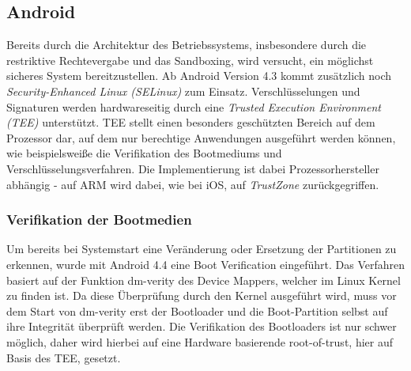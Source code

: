 \subsection{Android}\label{sec:android-hwsec}

	Bereits durch die Architektur des Betriebssystems, insbesondere durch die
	restriktive Rechtevergabe und das Sandboxing, wird versucht, ein möglichst
	sicheres System bereitzustellen. Ab Android Version 4.3 kommt zusätzlich noch
	\textit{Security-Enhanced Linux (SELinux)} zum Einsatz. Verschlüsselungen und
	Signaturen werden hardwareseitig durch eine \textit{Trusted Execution
	Environment (TEE)} unterstützt. TEE stellt einen besonders geschützten Bereich
	auf dem Prozessor dar, auf dem nur berechtige Anwendungen ausgeführt werden
	können, wie beispielsweiße die Verifikation des Bootmediums und
	Verschlüsselungsverfahren. Die Implementierung ist dabei Prozessorhersteller
	abhängig - auf ARM wird dabei, wie bei iOS, auf \textit{TrustZone}
	\cite{TEE_ARM} zurückgegriffen.
	
	\subsubsection{Verifikation der Bootmedien}
	\label{sec:VerifikationDerBootmedien} Um bereits bei Systemstart eine
	Veränderung oder Ersetzung der Partitionen zu erkennen, wurde mit Android 4.4
	eine Boot Verification eingeführt. Das Verfahren basiert auf der Funktion
	dm-verity des Device Mappers, welcher im Linux Kernel zu finden ist. Da diese
	Überprüfung durch den Kernel ausgeführt wird, muss vor dem Start von dm-verity
	erst der Bootloader und die Boot-Partition selbst auf ihre Integrität
	überprüft werden. Die Verifikation des Bootloaders ist nur schwer möglich,
	daher wird hierbei auf eine Hardware basierende root-of-trust, hier auf Basis
	des TEE, gesetzt.
	
